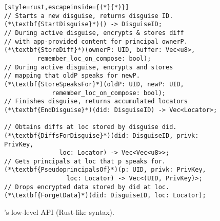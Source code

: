 \begin{figure}[t]
\begin{lstlisting}[style=rust,escapeinside={(*}{*)}]
// Starts a new disguise, returns disguise ID.
(*\textbf{StartDisguise}*)() -> DisguiseID;
// During active disguise, encrypts & stores diff
// with app-provided content for principal ownerP.
(*\textbf{StoreDiff}*)(ownerP: UID, buffer: Vec<u8>,
         remember_loc_on_compose: bool);
// During active disguise, encrypts and stores
// mapping that oldP speaks for newP.
(*\textbf{StoreSpeaksFor}*)(oldP: UID, newP: UID,
             remember_loc_on_compose: bool);
// Finishes disguise, returns accumulated locators
(*\textbf{EndDisguise}*)(did: DisguiseID) -> Vec<Locator>;

// Obtains diffs at loc stored by disguise did.
(*\textbf{DiffsForDisguise}*)(did: DisguiseID, privk: PrivKey,
               loc: Locator) -> Vec<Vec<u8>>;
// Gets principals at loc that p speaks for.
(*\textbf{PseudoprincipalsOf}*)(p: UID, privk: PrivKey,
                 loc: Locator) -> Vec<(UID, PrivKey)>;
// Drops encrypted data stored by did at loc.
(*\textbf{ForgetData}*)(did: DisguiseID, loc: Locator);
\end{lstlisting}
\caption{\sys's low-level API (Rust-like syntax).}
\label{f:api-low}
\end{figure}


